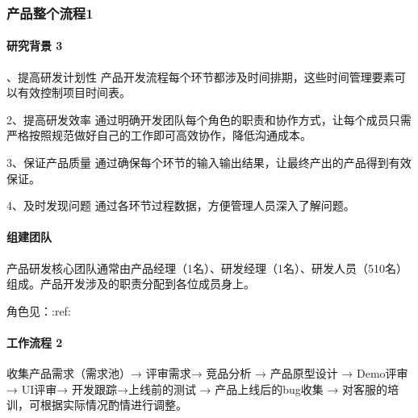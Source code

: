 \documentclass[letterpaper,11pt,english]{sphinxmanual}
\begin{document}


\subsubsection{产品整个流程1\sphinxfootnotemark[721]}
\label{\detokenize{chapter_project/process:id1}}\label{\detokenize{chapter_project/process::doc}}%
\begin{footnotetext}[721]\sphinxAtStartFootnote
{}
%
\end{footnotetext}\ignorespaces 

\paragraph{研究背景 3\sphinxfootnotemark[722]}
\label{\detokenize{chapter_project/process:id2}}%
\begin{footnotetext}[722]\sphinxAtStartFootnote
{}
%
\end{footnotetext}、提高研发计划性
产品开发流程每个环节都涉及时间排期，这些时间管理要素可以有效控制项目时间表。

2、提高研发效率
通过明确开发团队每个角色的职责和协作方式，让每个成员只需严格按照规范做好自己的工作即可高效协作，降低沟通成本。

3、保证产品质量
通过确保每个环节的输入输出结果，让最终产出的产品得到有效保证。

4、及时发现问题 通过各环节过程数据，方便管理人员深入了解问题。


\paragraph{组建团队}
\label{\detokenize{chapter_project/process:id3}}
产品研发核心团队通常由产品经理（1名）、研发经理（1名）、研发人员（5\sphinxhyphen{}10名）组成。产品开发涉及的职责分配到各位成员身上。

角色见：:ref:


\paragraph{工作流程 2\sphinxfootnotemark[723]}
\label{\detokenize{chapter_project/process:id4}}%
\begin{footnotetext}[723]\sphinxAtStartFootnote
{}
%
\end{footnotetext}\ignorespaces 
收集产品需求（需求池）→ 评审需求→ 竞品分析 → 产品原型设计 → Demo评审→
UI评审→ 开发跟踪→上线前的测试 → 产品上线后的bug收集 →
对客服的培训，可根据实际情况酌情进行调整。
\end{document}
